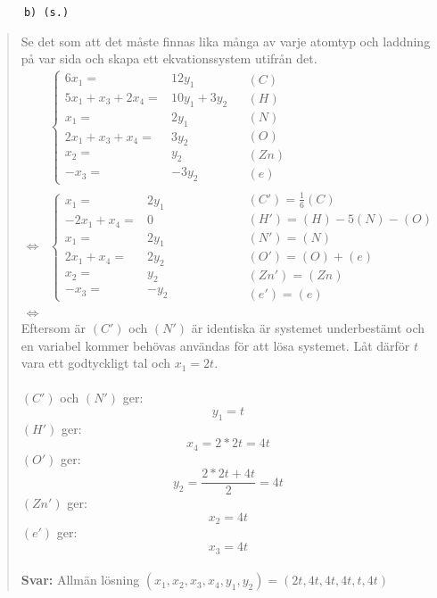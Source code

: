 \documentclass[a4paper]{article}
\newcommand{\tskcol}[1]{\textcolor{tskcol}{#1}}
\begin{document}
\texttt{\tskcol{~~~~~~b) (s.)}}
\begin{quotation}
	\noindent
	Se det som att det måste finnas lika många av varje atomtyp och laddning på var sida och skapa ett ekvationssystem utifrån det.
	\begin{align*}
	&\left\{\begin{array}{rl}
	6x_1=&12y_1 \\
	5x_1+x_3+2x_4=&10y_1+3y_2 \\
	x_1=&2y_1 \\
	2x_1+x_3+x_4=&3y_2 \\
	x_2=&y_2 \\
	-x_3=&-3y_2
	\end{array}\right.
	&\begin{array}{l}
	(C) \\
	(H) \\
	(N) \\
	(O) \\
	(Zn) \\
	(e)
	\end{array} \\ \Leftrightarrow
	&\left\{\begin{array}{rl}
	x_1=&2y_1 \\
	-2x_1+x_4=&0 \\
	x_1=&2y_1 \\
	2x_1+x_4=&2y_2 \\
	x_2=&y_2 \\
	-x_3=&-y_2
	\end{array}\right.
	&\begin{array}{l}
	(C')=\frac{1}{6}(C) \\
	(H')=(H)-5(N)-(O) \\
	(N')=(N) \\
	(O')=(O)+(e) \\
	(Zn')=(Zn) \\
	(e')=(e)
	\end{array} \\ \Leftrightarrow
	\end{align*}
	Eftersom är $(C')$ och $(N')$ är identiska är systemet underbestämt och en variabel kommer behövas användas för att lösa systemet. Låt därför $t$ vara ett godtyckligt tal och $x_1=2t$. \\ \\
	$(C')$ och $(N')$ ger:
	\[y_1=t\]
	$(H')$ ger:
	\[x_4=2*2t=4t\]
	$(O')$ ger:
	\[y_2=\frac{2*2t+4t}{2}=4t\]
	$(Zn')$ ger:
	\[x_2=4t\]
	$(e')$ ger:
	\[x_3=4t\]
	\\
	\textbf{Svar:} Allmän lösning $(x_1,x_2,x_3,x_4,y_1,y_2)=(2t,4t,4t,4t,t,4t)$
\end{quotation}
\end{document}
